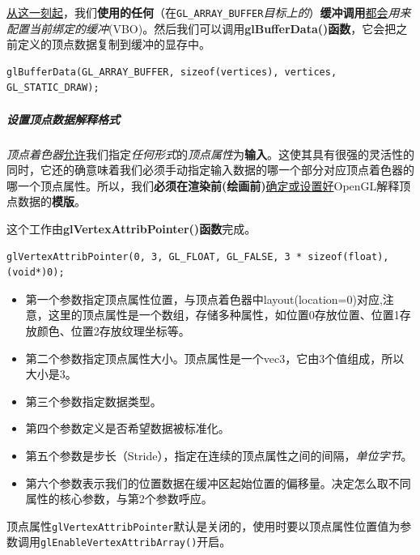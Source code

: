 \documentclass[UTF8,a4paper,12pt]{ctexbook}
\begin{document}
					\underline{从这一刻起}，我们\textbf{使用的任何}（在\verb|GL_ARRAY_BUFFER|\textit{目标上的}）\textbf{缓冲调用}\underline{都会}\textit{用来配置当前绑定的缓冲}(VBO)。然后我们可以调用\textbf{glBufferData()函数}，它会把之前定义的顶点数据复制到缓冲的显存中。
					
					\begin{lstlisting}
glBufferData(GL_ARRAY_BUFFER, sizeof(vertices), vertices, GL_STATIC_DRAW);					
					\end{lstlisting}
								
							
				\subparagraph{设置顶点数据解释格式}
					\textit{顶点着色器}\underline{允许}我们指定\textit{任何形式}的\textit{顶点属性}为\textbf{输入}。这使其具有很强的灵活性的同时，它还的确意味着我们必须手动指定输入数据的哪一个部分对应顶点着色器的哪一个顶点属性。所以，我们\textbf{必须在渲染前(绘画前)}\underline{确定或设置好}OpenGL解释顶点数据的\textbf{模版}。	
						
					这个工作由\textbf{glVertexAttribPointer()函数}完成。	
					
					\begin{lstlisting}
glVertexAttribPointer(0, 3, GL_FLOAT, GL_FALSE, 3 * sizeof(float), (void*)0);
					\end{lstlisting}
					
					\begin{itemize}
						\item 第一个参数指定顶点属性位置，与顶点着色器中layout(location=0)对应,注意，这里的顶点属性是一个数组，存储多种属性，如位置0存放位置、位置1存放颜色、位置2存放纹理坐标等。
						\item 第二个参数指定顶点属性大小。顶点属性是一个vec3，它由3个值组成，所以大小是3。
						\item 第三个参数指定数据类型。
						\item 第四个参数定义是否希望数据被标准化。
						\item 第五个参数是步长（Stride），指定在连续的顶点属性之间的间隔，\textit{单位字节}。
						\item 第六个参数表示我们的位置数据在缓冲区起始位置的偏移量。决定怎么取不同属性的核心参数，与第2个参数呼应。
					\end{itemize}
					
					顶点属性\verb|glVertexAttribPointer|默认是关闭的，使用时要以顶点属性位置值为参数调用\verb|glEnableVertexAttribArray()|开启。
					
\end{document}
